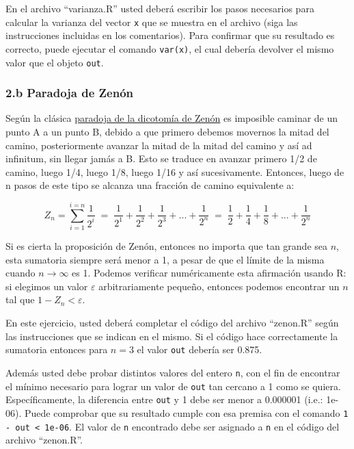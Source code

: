\documentclass[]{article}
\begin{document}
En el archivo ``varianza.R'' usted deberá escribir los pasos necesarios
para calcular la varianza del vector \texttt{x} que se muestra en el
archivo (siga las instrucciones incluidas en los comentarios). Para
confirmar que su resultado es correcto, puede ejecutar el comando
\texttt{var(x)}, el cual debería devolver el mismo valor que el objeto
\texttt{out}.

\subsubsection{2.b Paradoja de Zenón}

Según la clásica
\href{https://es.wikipedia.org/wiki/Paradojas\_de\_Zen\%C3\%B3n\#La\_dicotom.C3.ADa}{paradoja
de la dicotomía de Zenón} es imposible caminar de un punto A a un punto
B, debido a que primero debemos movernos la mitad del camino,
posteriormente avanzar la mitad de la mitad del camino y así ad
infinitum, sin llegar jamás a B. Esto se traduce en avanzar primero 1/2
de camino, luego 1/4, luego 1/8, luego 1/16 y así sucesivamente.
Entonces, luego de n pasos de este tipo se alcanza una fracción de
camino equivalente a:

\[Z_n = \sum_{i=1}^{i=n} \frac{1}{2 ^ i} \;=\;
  \frac{1}{2 ^ 1} + \frac{1}{2 ^ 2} + \frac{1}{2 ^ 3} + ... + \frac{1}{2 ^ n} \;=\;
  \frac{1}{2} + \frac{1}{4} + \frac{1}{8} + ... + \frac{1}{2 ^ n}\]

Si es cierta la proposición de Zenón, entonces no importa que tan grande
sea $n$, esta sumatoria siempre será menor a 1, a pesar de que el límite
de la misma cuando $n \to \infty$ es 1. Podemos verificar numéricamente
esta afirmación usando R: si elegimos un valor $\varepsilon$
arbitrariamente pequeño, entonces podemos encontrar un $n$ tal que
$1 - Z_n < \varepsilon$.

En este ejercicio, usted deberá completar el código del archivo
``zenon.R'' según las instrucciones que se indican en el mismo. Si el
código hace correctamente la sumatoria entonces para $n = 3$ el valor
\texttt{out} debería ser 0.875.

Además usted debe probar distintos valores del entero \texttt{n}, con el fin de
encontrar el mínimo necesario para lograr un valor de \texttt{out} tan cercano a
1 como se quiera. Específicamente, la diferencia entre \texttt{out} y 1 debe ser
menor a 0.000001 (i.e.: 1e-06). Puede comprobar que su resultado cumple con esa
premisa con el comando \texttt{1 - out \textless{} 1e-06}. El valor de \texttt{n}
encontrado debe ser asignado a \texttt{n} en el código del archivo ``zenon.R''.
\end{document}
